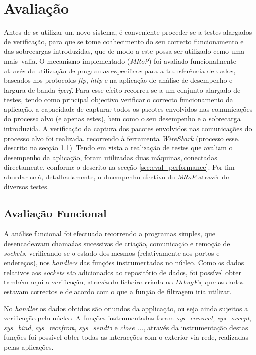 \chapter{Avaliação}
\label{cap:avaliacao}

Antes de se utilizar um novo sistema, é conveniente proceder-se a testes alargados de verificação, para que se tome conhecimento do seu correcto funcionamento e das sobrecargas introduzidas, que de modo a este possa ser utilizado como uma mais–valia. 
O mecanismo implementado (\textit{MRoP}) foi avaliado funcionalmente através da utilização de programas específicos para a transferência de dados, baseados nos protocolos \textit{ftp}, \textit{http} e na aplicação de análise de desempenho e largura de banda \textit{iperf}.
Para esse efeito recorreu-se a um conjunto alargado de testes, tendo como principal objectivo verificar o correcto funcionamento da aplicação, a capacidade de capturar todos os pacotes envolvidos nas comunicações do processo alvo (e apenas estes), bem como o seu desempenho e a sobrecarga introduzida.
A verificação da captura dos pacotes envolvidos nas comunicações do processo alvo foi realizada, recorrendo à ferramenta \textit{WireShark} (processo esse, descrito na secção \ref{sec:eval_functional}).
Tendo em vista a realização de testes que avaliam o desempenho da aplicação, foram utilizadas duas máquinas, conectadas directamente, conforme o descrito  na secção \ref{sec:eval_performance}.
Por fim abordar-se-à, detalhadamente, o desempenho efectivo do \textit{MRoP} através de diversos testes.


\section{Avaliação Funcional}
\label{sec:eval_functional}


A análise funcional foi efectuada recorrendo a programas simples, que desencadeavam chamadas sucessivas de criação, comunicação e remoção de \textit{sockets}, verificando-se o estado dos mesmos (relativamente aos portos e endereços), nos \textit{handlers} das funções instrumentadas no núcleo.
Como os dados relativos aos \textit{sockets} são adicionados ao repositório de dados, foi possível obter também aqui a verificação, através do ficheiro criado no \textit{DebugFs}, que os dados estavam correctos e de acordo com o que a função de filtragem iria utilizar.

No \textit{handler} os dados obtidos são oriundos da applicação, ou seja ainda sujeitos a verificação pelo núcleo.
A funções instrumentadas foram \textit{sys\_connect}, \textit{sys\_accept}, \textit{sys\_bind}, \textit{sys\_recvfrom}, \textit{sys\_sendto} e \textit{close ...}, através da instrumentação destas funções foi possível obter todas as interacções com o exterior via rede, realizadas pelas aplicações.


